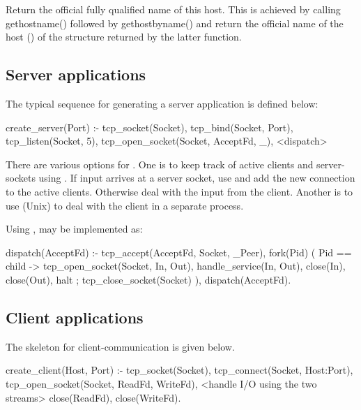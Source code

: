 \documentclass[11pt]{article}
\begin{document}
\begin{description}
Return the official fully qualified name of this host.  This is achieved
by calling gethostname() followed by gethostbyname() and return the 
official name of the host () of the structure returned
by the latter function.
\end{description}


\subsection{Server applications}

The typical sequence for generating a server application is defined
below:

\begin{code}
create_server(Port) :-
        tcp_socket(Socket),
        tcp_bind(Socket, Port),
        tcp_listen(Socket, 5),
        tcp_open_socket(Socket, AcceptFd, _),
        <dispatch>
\end{code}

\noindent
There are various options for . One is to keep track of active
clients and server-sockets using . If input arrives at a
server socket, use  and add the new connection to the active
clients. Otherwise deal with the input from the client.  Another is
to use (Unix)  to deal with the client in a separate process.

Using ,  may be implemented as:

\begin{code}
dispatch(AcceptFd) :-
        tcp_accept(AcceptFd, Socket, _Peer),
        fork(Pid)
        (   Pid == child
        ->  tcp_open_socket(Socket, In, Out),
            handle_service(In, Out),
            close(In),
            close(Out),
            halt
        ;   tcp_close_socket(Socket)
        ),
        dispatch(AcceptFd).
\end{code}

\noindent
\subsection{Client applications}

The skeleton for client-communication is given below.

\begin{code}
create_client(Host, Port) :-
        tcp_socket(Socket),
        tcp_connect(Socket, Host:Port),
        tcp_open_socket(Socket, ReadFd, WriteFd),
        <handle I/O using the two streams>
        close(ReadFd),
        close(WriteFd).
\end{code}
\end{document}
